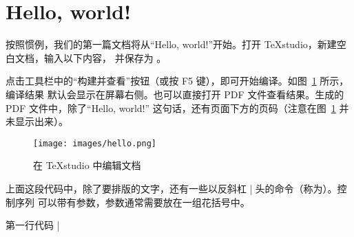 \section{Hello, world!}

按照惯例，我们的第一篇文档将从“Hello, world!”开始。打开 TeXstudio，新建空白文档，输入以下内容，
并保存为 。


点击工具栏中的“构建并查看”按钮（或按 F5 键），即可开始编译。如图~\ref{fig:hello} 所示，编译结果
默认会显示在屏幕右侧。也可以直接打开 PDF 文件查看结果。生成的 PDF 文件中，除了“Hello, world!”
这句话，还有页面下方的页码（注意在图~\ref{fig:hello} 并未显示出来）。

\begin{figure}[htb]
  \texttt{[image: images/hello.png]}
  \caption{在 TeXstudio 中编辑文档 }
  \label{fig:hello}
\end{figure}

上面这段代码中，除了要排版的文字，还有一些以反斜杠 |\| 开头的命令（称为）。控制序列
可以带有参数，参数通常需要放在一组花括号中。

第一行代码 |\documentclass{article}| 中包含了命令 。这一命令用来指定，
它是对文档样式的总体设定。 文档类是 \LaTeX{} 的标准文档类之一，表示篇幅较短的文章。

第三行与第五行分别包含了命令  与 。这两个命令以及它们中间的内容称为。
这里就声明了一个名为  的环境。只有在  环境中的内容，才会被排版到文档中。
 与 || 之间的部分称为。对文档样式的所有设置，都应当
放在导言区中。

我们可以发现，内容与格式分离的原则在这里得到了很好的贯彻：文档内容必须放在  环境中，
而排版样式则需要在导言区中定义。如果不遵守这种约定，很有可能导致编译错误。

第二行以百分号 |%
排版结果有任何影响。

\section{你好，world！}

